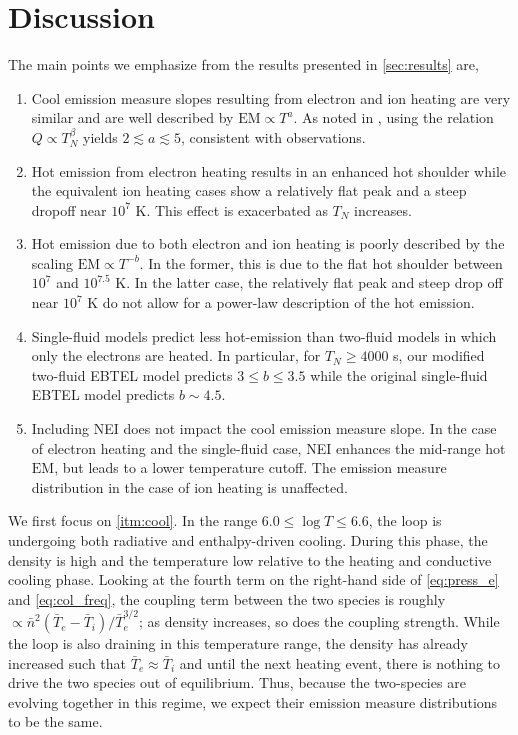 \documentclass[apj]{emulateapj}
\begin{document}
	\section{Discussion}
	\label{sec:discussion}
	\par The main points we emphasize from the results presented in \autoref{sec:results} are,
	\begin{enumerate}
		\item Cool emission measure slopes resulting from electron and ion heating are very similar and are well described by $\mathrm{EM}\propto T^a$. As noted in \citet{cargill_active_2014}, using the relation $Q\propto T_N^{\beta}$ yields $2\lesssim a\lesssim5$, consistent with observations.\label{itm:cool}
		\item Hot emission from electron heating results in an enhanced hot shoulder while the equivalent ion heating cases show a relatively flat peak and a steep dropoff near $10^7$ K. This effect is exacerbated as $T_N$ increases.\label{itm:hot}
		\item Hot emission due to both electron and ion heating is poorly described by the scaling $\mathrm{EM}\propto T^{-b}$. In the former, this is due to the flat hot shoulder between $10^7$ and $10^{7.5}$ K. In the latter case, the relatively flat peak and steep drop off near $10^7$ K do not allow for a power-law description of the hot emission.\label{itm:deriv}
		\item Single-fluid models predict less hot-emission than two-fluid models in which only the electrons are heated. In particular, for $T_N\ge4000$ s, our modified two-fluid EBTEL model predicts $3\le b\le3.5$ while the original single-fluid EBTEL model predicts $b\sim4.5$.\label{itm:histos}
		\item Including NEI does not impact the cool emission measure slope. In the case of electron heating and the single-fluid case, NEI enhances the mid-range hot $\mathrm{EM}$, but leads to a lower temperature cutoff. The emission measure distribution in the case of ion heating is unaffected. \label{itm:nei}
	\end{enumerate}
	\par We first focus on \autoref{itm:cool}. In the range $6.0\le\log{T}\le6.6$, the loop is undergoing both radiative and enthalpy-driven cooling. During this phase, the density is high and the temperature low relative to the heating and conductive cooling phase. Looking at the fourth term on the right-hand side of \autoref{eq:press_e} and \autoref{eq:col_freq}, the coupling term between the two species is roughly $\propto\bar{n}^2(\bar{T}_e-\bar{T}_i)/\bar{T}_e^{3/2}$; as density increases, so does the coupling strength. While the loop is also draining in this temperature range, the density has already increased such that $\bar{T}_e\approx\bar{T}_i$ and until the next heating event, there is nothing to drive the two species out of equilibrium. Thus, because the two-species are evolving together in this regime, we expect their emission measure distributions to be the same.
\end{document}
